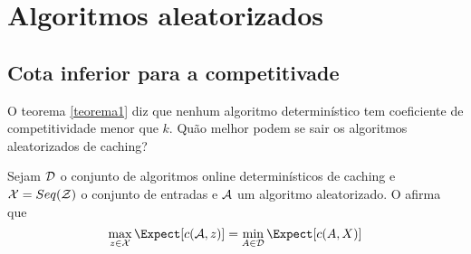 \section{Algoritmos aleatorizados}

\subsection{Cota inferior para a competitivade}

O teorema \ref{teorema1} diz que nenhum algoritmo determinístico tem coeficiente de competitividade menor que \(k\). Quão melhor podem se sair os algoritmos aleatorizados de caching?

Sejam \(\mathcal{D}\) o conjunto de algoritmos online determinísticos de caching e \(\mathcal{X} = Seq(\mathcal{Z})\) o conjunto de entradas e \(\mathcal{A}\) um algoritmo aleatorizado. O  afirma que 
\begin{equation}
  \label{eq:minimax}
    \max_{z \in \Xcal} \Expect[c(\Acal,z)] = \min_{A \in \Dcal} \Expect[c(A,X)]
\end{equation}

